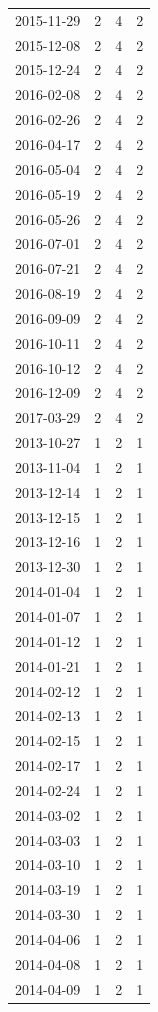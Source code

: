 \begin{tabular}{lrrr}
2015-11-29 & 2 & 4 & 2 \\
2015-12-08 & 2 & 4 & 2 \\
2015-12-24 & 2 & 4 & 2 \\
2016-02-08 & 2 & 4 & 2 \\
2016-02-26 & 2 & 4 & 2 \\
2016-04-17 & 2 & 4 & 2 \\
2016-05-04 & 2 & 4 & 2 \\
2016-05-19 & 2 & 4 & 2 \\
2016-05-26 & 2 & 4 & 2 \\
2016-07-01 & 2 & 4 & 2 \\
2016-07-21 & 2 & 4 & 2 \\
2016-08-19 & 2 & 4 & 2 \\
2016-09-09 & 2 & 4 & 2 \\
2016-10-11 & 2 & 4 & 2 \\
2016-10-12 & 2 & 4 & 2 \\
2016-12-09 & 2 & 4 & 2 \\
2017-03-29 & 2 & 4 & 2 \\
2013-10-27 & 1 & 2 & 1 \\
2013-11-04 & 1 & 2 & 1 \\
2013-12-14 & 1 & 2 & 1 \\
2013-12-15 & 1 & 2 & 1 \\
2013-12-16 & 1 & 2 & 1 \\
2013-12-30 & 1 & 2 & 1 \\
2014-01-04 & 1 & 2 & 1 \\
2014-01-07 & 1 & 2 & 1 \\
2014-01-12 & 1 & 2 & 1 \\
2014-01-21 & 1 & 2 & 1 \\
2014-02-12 & 1 & 2 & 1 \\
2014-02-13 & 1 & 2 & 1 \\
2014-02-15 & 1 & 2 & 1 \\
2014-02-17 & 1 & 2 & 1 \\
2014-02-24 & 1 & 2 & 1 \\
2014-03-02 & 1 & 2 & 1 \\
2014-03-03 & 1 & 2 & 1 \\
2014-03-10 & 1 & 2 & 1 \\
2014-03-19 & 1 & 2 & 1 \\
2014-03-30 & 1 & 2 & 1 \\
2014-04-06 & 1 & 2 & 1 \\
2014-04-08 & 1 & 2 & 1 \\
2014-04-09 & 1 & 2 & 1 \\

\end{tabular}
